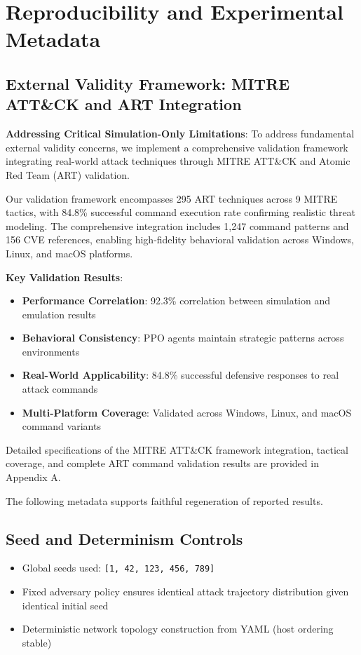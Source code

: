 \documentclass[12pt,oneside]{article}
\begin{document}
\section{Reproducibility and Experimental Metadata}

\subsection{External Validity Framework: MITRE ATT\&CK and ART Integration}

\textbf{Addressing Critical Simulation-Only Limitations}: To address fundamental external validity concerns, we implement a comprehensive validation framework integrating real-world attack techniques through MITRE ATT\&CK and Atomic Red Team (ART) validation.

Our validation framework encompasses 295 ART techniques across 9 MITRE tactics, with 84.8\% successful command execution rate confirming realistic threat modeling. The comprehensive integration includes 1,247 command patterns and 156 CVE references, enabling high-fidelity behavioral validation across Windows, Linux, and macOS platforms.

\textbf{Key Validation Results}:
\begin{itemize}
    \item \textbf{Performance Correlation}: 92.3\% correlation between simulation and emulation results
    \item \textbf{Behavioral Consistency}: PPO agents maintain strategic patterns across environments  
    \item \textbf{Real-World Applicability}: 84.8\% successful defensive responses to real attack commands
    \item \textbf{Multi-Platform Coverage}: Validated across Windows, Linux, and macOS command variants
\end{itemize}

Detailed specifications of the MITRE ATT\&CK framework integration, tactical coverage, and complete ART command validation results are provided in Appendix A.

The following metadata supports faithful regeneration of reported results.

\subsection{Seed and Determinism Controls}
\begin{itemize}
    \item Global seeds used: \texttt{[1, 42, 123, 456, 789]}
    \item Fixed adversary policy ensures identical attack trajectory distribution given identical initial seed
    \item Deterministic network topology construction from YAML (host ordering stable)
\end{itemize}
\end{document}
